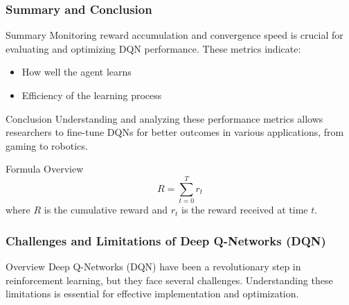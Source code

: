 \documentclass[aspectratio=169]{beamer}
\begin{document}
\begin{frame}[fragile]
    \frametitle{Summary and Conclusion}
    \begin{block}{Summary}
        Monitoring reward accumulation and convergence speed is crucial for evaluating and optimizing DQN performance. 
        These metrics indicate:
        \begin{itemize}
            \item How well the agent learns
            \item Efficiency of the learning process
        \end{itemize}
    \end{block}

    \begin{block}{Conclusion}
        Understanding and analyzing these performance metrics allows researchers to fine-tune DQNs for better outcomes in various applications, from gaming to robotics.
    \end{block}

    \begin{block}{Formula Overview}
        \begin{equation}
            R = \sum_{t=0}^{T} r_t
        \end{equation}
        where \( R \) is the cumulative reward and \( r_t \) is the reward received at time \( t \).
    \end{block}
\end{frame}

\begin{frame}[fragile]
    \frametitle{Challenges and Limitations of Deep Q-Networks (DQN)}
    \begin{block}{Overview}
        Deep Q-Networks (DQN) have been a revolutionary step in reinforcement learning, but they face several challenges. Understanding these limitations is essential for effective implementation and optimization.
    \end{block}
\end{frame}
\end{document}
